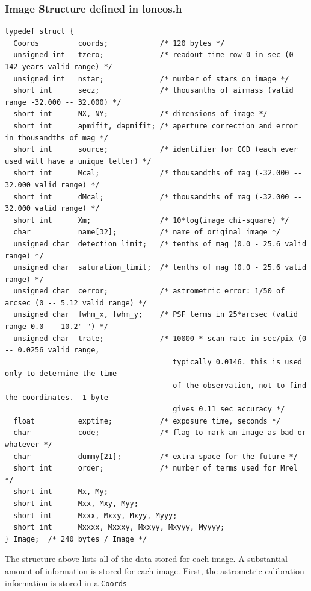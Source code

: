 \documentclass{article}
\begin{document}
\subsubsection*{Image Structure defined in loneos.h}
{\footnotesize
\begin{verbatim}
typedef struct {
  Coords         coords;            /* 120 bytes */
  unsigned int   tzero;             /* readout time row 0 in sec (0 - 142 years valid range) */
  unsigned int   nstar;             /* number of stars on image */
  short int      secz;              /* thousanths of airmass (valid range -32.000 -- 32.000) */
  short int      NX, NY;            /* dimensions of image */
  short int      apmifit, dapmifit; /* aperture correction and error in thousandths of mag */
  short int      source;            /* identifier for CCD (each ever used will have a unique letter) */
  short int      Mcal;              /* thousandths of mag (-32.000 -- 32.000 valid range) */
  short int      dMcal;             /* thousandths of mag (-32.000 -- 32.000 valid range) */
  short int      Xm;                /* 10*log(image chi-square) */
  char           name[32];          /* name of original image */
  unsigned char  detection_limit;   /* tenths of mag (0.0 - 25.6 valid range) */
  unsigned char  saturation_limit;  /* tenths of mag (0.0 - 25.6 valid range) */
  unsigned char  cerror;            /* astrometric error: 1/50 of arcsec (0 -- 5.12 valid range) */
  unsigned char  fwhm_x, fwhm_y;    /* PSF terms in 25*arcsec (valid range 0.0 -- 10.2" ") */
  unsigned char  trate;             /* 10000 * scan rate in sec/pix (0 -- 0.0256 valid range, 
                                       typically 0.0146. this is used only to determine the time
                                       of the observation, not to find the coordinates.  1 byte
                                       gives 0.11 sec accuracy */
  float          exptime;           /* exposure time, seconds */
  char           code;              /* flag to mark an image as bad or whatever */
  char           dummy[21];         /* extra space for the future */
  short int      order;             /* number of terms used for Mrel */
  short int      Mx, My;
  short int      Mxx, Mxy, Myy;
  short int      Mxxx, Mxxy, Mxyy, Myyy;
  short int      Mxxxx, Mxxxy, Mxxyy, Mxyyy, Myyyy;
} Image;  /* 240 bytes / Image */
\end{verbatim}}
The structure above lists all of the data stored for each image.  A
substantial amount of information is stored for each image.  First,
the astrometric calibration information is stored in a {\tt Coords}
\end{document}

